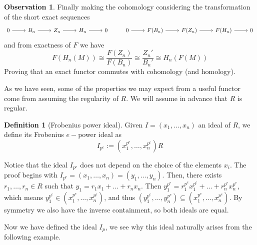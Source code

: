 \documentclass[leqno]{article}
\theoremstyle{definition}
\newtheorem{definition}{Definition}[section]
\newtheorem{observation}{Observation}[section]
\begin{document}
\begin{observation}
Finally making the cohomology considering the transformation of the short exact sequences
\[\begin{tikzcd}
	0 & {B_n} & {Z_n} & {H_n} & 0 & 0 & {F(B_n)} & {F(Z_n)} & {F(H_n)} & 0
	\arrow[from=1-1, to=1-2]
	\arrow[from=1-2, to=1-3]
	\arrow[from=1-3, to=1-4]
	\arrow[from=1-4, to=1-5]
	\arrow[from=1-6, to=1-7]
	\arrow[from=1-7, to=1-8]
	\arrow[from=1-8, to=1-9]
	\arrow[from=1-9, to=1-10]
\end{tikzcd}\]
and from exactness of $F$ we have
\[
F(H_n(M)) \cong  \frac{F(Z_n)}{F(B_n)} \cong  \frac{Z_n'}{B_n'} \cong H_n(F(M))
\] 
Proving that an exact functor commutes with cohomology (and homology).
\end{observation}

As we have seen, some of the properties we may expect from a useful functor come from assuming the regularity of $R$. We will assume in advance that $R$ is regular.

\begin{definition}[Frobenius power ideal] Given  $I = (x_1, \ldots, x_n)$ an ideal of $R$, we define its Frobenius $e-$power ideal as
   \[
	 I _{p^e} := (x_1^{p^e}, \ldots, x_n ^{p^e})R
  \] 
\end{definition}
Notice that the ideal $I _{p^e}$ does not depend on the choice of the elements $x_i$. The proof begins with $I _{p^e} = (x_1, \ldots, x_n) = (y_1, \ldots, y_n)$. Then, there exists $r_1, \ldots, r_n \in R$ such that $y_1 = r_1x_1+\ldots+ r_nx_n$. Then $y_1 ^{p^e} = r_1 ^{p^e}x_1 ^{p^e} + \ldots+ r_n^{p^e}x_n^{p^e}$, which means $y_1 ^{p^e} \in (x_1 ^{p^e}, \ldots, x_n ^{p^e})$, and thus $(y_1 ^{p^e}, \ldots, y_n ^{p^e})\subseteq (x_1 ^{p^e}, \ldots, x_n ^{p^e})$. By symmetry we also have the inverse containment, so both ideals are equal.

Now we have defined the ideal $I _{p}$, we see why this ideal naturally arises from the following example.
\end{document}

